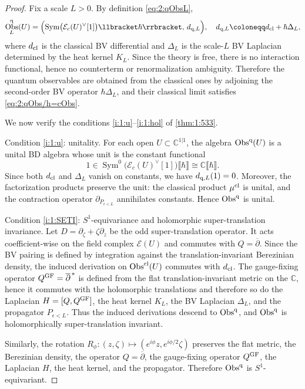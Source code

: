 \documentclass[final,reqno]{amsart}
\numberwithin{equation}{section}
\theoremstyle{definition}
\newcommand{\ep}{\epsilon}
\newcommand{\ceq}{\coloneqq} %
\newcommand{\mto}{\mapsto}
\newcommand{\q}{\textup{q}}
\newcommand{\GF}{\textup{GF}}
\newcommand{\tcl}{\textup{cl}}
\newcommand{\bbC}{\mathbb{C}}
\newcommand{\clE}{\mathcal{E}}
\newcommand{\pd}{\partial}
\newcommand{\bpd}{\overline{\partial}}
\newcommand{\dbr}[1]{\llbracket #1 \rrbracket} %
\newcommand{\cObs}[1]{\mathop{\Obs^{\textup{cl}}_{#1}}}
\newcommand{\qObs}[1]{\mathop{\Obs^{\textup{q}}_{#1}}}
\DeclareMathOperator{\Sym}{Sym}
\DeclareMathOperator{\Obs}{Obs}
\begin{document}
\begin{proof}
Fix a scale $L>0$. 
By definition \eqref{eq:2:qObsL},
\[
 \qObs{L}(U) = 
 \Bigl(\Sym\bigl(\clE_c(U)^\vee[1]\bigr)\dbr{\hbar},\, d_{\q,L}\Bigr), \quad
 d_{\q,L} \ceq d_{\tcl}+\hbar\Delta_L,
\]
where $d_{\tcl}$ is the classical BV differential and 
$\Delta_L$ is the scale-$L$ BV Laplacian determined by the heat kernel $K_L$. 
Since the theory is free, there is no interaction functional, 
hence no counterterm or renormalization ambiguity. 
Therefore the quantum observables are obtained from the classical ones 
by adjoining the second-order BV operator $\hbar\Delta_L$, 
and their classical limit satisfies \eqref{eq:2:qObs/h=cObs}.

We now verify the conditions \ref{i:1:u}--\ref{i:1:hol} of \cref{thm:1:533}.

\smallskip

Condition \ref{i:1:u}: unitality.
For each open $U \subset \bbC^{1|1}$, the algebra $\qObs{}(U)$ is 
a unital BD algebra whose unit is the constant functional
\[
 1 \in \Sym^0\bigl(\clE_c(U)^\vee[1]\bigr)\dbr{\hbar} \cong \bbC\dbr{\hbar}.
\]
Since both $d_{\tcl}$ and $\Delta_L$ vanish on constants, 
we have $d_{\q,L}(1)=0$. 
Moreover, the factorization products preserve the unit: 
the classical product $\mu^{\tcl}$ is unital, 
and the contraction operator $\pd_{P_{\ep<L}}$ 
annihilates constants. Hence $\qObs{}$ is unital.

\smallskip

Condition \ref{i:1:SETI}: 
$S^1$-equivariance and holomorphic super-translation invariance.
Let $D = \pd_\zeta+\zeta\pd_z$ be the odd super-translation operator. 
It acts coefficient-wise on the field complex $\clE(U)$ 
and commutes with $Q=\bpd$. 
Since the BV pairing is defined by integration against 
the translation-invariant Berezinian density, 
the induced derivation on $\cObs{}(U)$ commutes with $d_{\tcl}$. 
The gauge-fixing operator $Q^{\GF}=\bpd^{\,*}$ is defined from
the flat translation-invariant metric on the $\bbC$, 
hence it commutes with the holomorphic translations and 
therefore so do the Laplacian $H=[Q,Q^{\GF}]$, the heat kernel $K_L$, 
the BV Laplacian $\Delta_L$, and the propagator $P_{\ep<L}$. 
Thus the induced derivations descend to $\qObs{}$, 
and $\qObs{}$ is holomorphically super-translation invariant.

Similarly, the rotation
$R_\phi\colon (z,\zeta) \mto (e^{i\phi}z,e^{i\phi/2}\zeta)$
preserves the flat metric, the Berezinian density, the operator $Q=\bpd$,
the gauge-fixing operator $Q^{\GF}$, the Laplacian $H$, 
the heat kernel, and the propagator. 
Therefore $\qObs{}$ is $S^1$-equivariant.


\end{proof}
\end{document}
